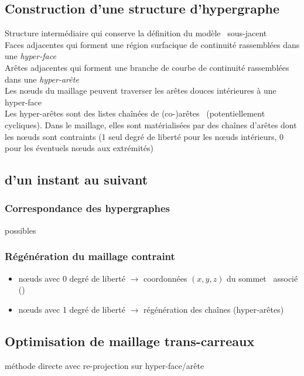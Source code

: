 \subsection{Construction d'une structure d'hypergraphe}
Structure intermédiaire qui conserve la définition du modèle \brep\ sous-jacent \cite{foucault2008}\\
Faces adjacentes qui forment une région surfacique de continuité  rassemblées dans une \textit{hyper-face}\\
Arêtes adjacentes qui forment une branche de courbe de continuité  rassemblées dans une \textit{hyper-arête}\\
Les n\oe uds du maillage peuvent traverser les arêtes douces intérieures à une hyper-face\\
Les hyper-arêtes sont des listes chaînées de (co-)arêtes \brep\ (potentiellement cycliques).
Dans le maillage, elles sont matérialisées par des chaînes d'arêtes dont les n\oe uds sont contraints (1 seul degré de liberté pour les n\oe uds intérieurs, 0 pour les éventuels n\oe uds aux extrémités)

\subsection{ d'un instant au suivant}

\subsubsection{Correspondance des hypergraphes}
 possibles 

\subsubsection{Régénération du maillage contraint}%
\begin{itemize}
	\item n\oe uds avec 0 degré de liberté $\to$ coordonnées $(x,y,z)$ du sommet \brep\ associé ()
	\item n\oe uds avec 1 degré de liberté $\to$ régénération des chaînes (hyper-arêtes)
\end{itemize}

\subsubsection{}

\subsection{Optimisation de maillage trans-carreaux}
méthode directe avec re-projection sur hyper-face/arête